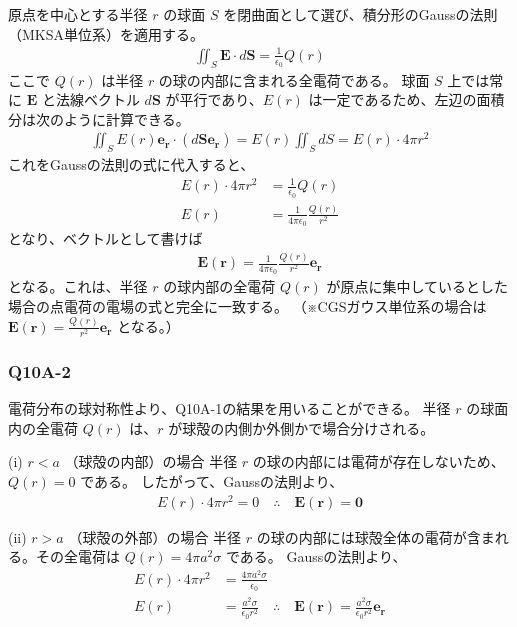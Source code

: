 \documentclass[platex,dvipdfmx,a4paper]{jsarticle}
\newcommand{\vect}[1]{\boldsymbol{#1}}
\begin{document}
  原点を中心とする半径 $r$ の球面 $S$ を閉曲面として選び、積分形のGaussの法則（MKSA単位系）を適用する。
  \begin{align*}
    \iint_S \vect{E} \cdot d\vect{S} = \frac{1}{\epsilon_0} Q(r)
  \end{align*}
  ここで $Q(r)$ は半径 $r$ の球の内部に含まれる全電荷である。
  球面 $S$ 上では常に $\vect{E}$ と法線ベクトル $d\vect{S}$ が平行であり、$E(r)$ は一定であるため、左辺の面積分は次のように計算できる。
  \begin{align*}
    \iint_S E(r)\vect{e_r} \cdot (d\vect{S}\vect{e_r}) = E(r) \iint_S dS = E(r) \cdot 4\pi r^2
  \end{align*}
  これをGaussの法則の式に代入すると、
  \begin{align*}
    E(r) \cdot 4\pi r^2 &= \frac{1}{\epsilon_0} Q(r) \\
    E(r) &= \frac{1}{4\pi\epsilon_0} \frac{Q(r)}{r^2}
  \end{align*}
  となり、ベクトルとして書けば
  \begin{align*}
    \vect{E}(\vect{r}) = \frac{1}{4\pi\epsilon_0} \frac{Q(r)}{r^2} \vect{e_r}
  \end{align*}
  となる。これは、半径 $r$ の球内部の全電荷 $Q(r)$ が原点に集中しているとした場合の点電荷の電場の式と完全に一致する。
  （※CGSガウス単位系の場合は $\vect{E}(\vect{r}) = \frac{Q(r)}{r^2} \vect{e_r}$ となる。）

  \subsubsection*{Q10A-2}
  電荷分布の球対称性より、Q10A-1の結果を用いることができる。
  半径 $r$ の球面内の全電荷 $Q(r)$ は、$r$ が球殻の内側か外側かで場合分けされる。

  (i) $r < a$ （球殻の内部）の場合
  半径 $r$ の球の内部には電荷が存在しないため、$Q(r) = 0$ である。
  したがって、Gaussの法則より、
  \begin{align*}
    E(r) \cdot 4\pi r^2 = 0 \quad \therefore \quad \vect{E}(\vect{r}) = \vect{0}
  \end{align*}

  (ii) $r > a$ （球殻の外部）の場合
  半径 $r$ の球の内部には球殻全体の電荷が含まれる。その全電荷は $Q(r) = 4\pi a^2 \sigma$ である。
  Gaussの法則より、
  \begin{align*}
    E(r) \cdot 4\pi r^2 &= \frac{4\pi a^2 \sigma}{\epsilon_0} \\
    E(r) &= \frac{a^2 \sigma}{\epsilon_0 r^2} \quad \therefore \quad \vect{E}(\vect{r}) = \frac{a^2 \sigma}{\epsilon_0 r^2} \vect{e_r}
  \end{align*}
\end{document}

